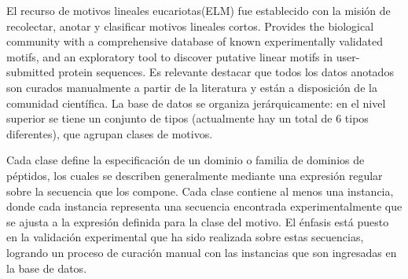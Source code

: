 El recurso de motivos lineales eucariotas(ELM) \cite{puntervoll2003elm,dinkel2013eukaryotic} fue establecido con la misión de recolectar, anotar y clasificar motivos lineales cortos. 
Provides the biological community with a comprehensive database of known experimentally validated motifs, and an exploratory tool to discover putative linear motifs in user-submitted protein sequences.
Es relevante destacar que todos los datos anotados son curados manualmente a partir de la literatura y están a disposición de la comunidad científica.
La base de datos se organiza jerárquicamente: en el nivel superior se tiene un conjunto de tipos (actualmente hay un total de 6 tipos diferentes), que agrupan clases de motivos. 

Cada clase define la especificación de un dominio o familia de dominios de péptidos, los cuales se describen generalmente mediante una expresión regular sobre la secuencia que los compone.
Cada clase contiene al menos una instancia, donde cada instancia representa una secuencia encontrada experimentalmente que se ajusta a la expresión definida para la clase del motivo.
El énfasis está puesto en la validación experimental que ha sido realizada sobre estas secuencias, logrando un proceso de curación manual con las instancias que son ingresadas en la base de datos. 



